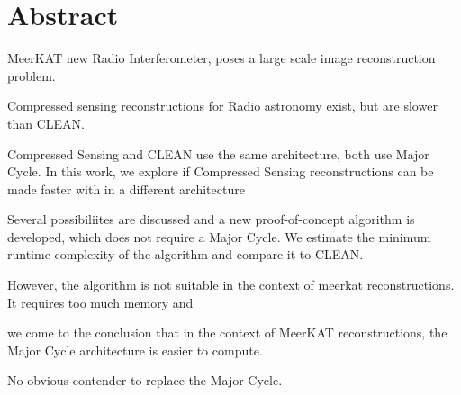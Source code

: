 \section*{Abstract}
MeerKAT new Radio Interferometer, poses a large scale image reconstruction problem.

Compressed sensing reconstructions for Radio astronomy exist, but are slower than CLEAN. 

Compressed Sensing and CLEAN use the same architecture, both use Major Cycle. In this work, we explore if Compressed Sensing reconstructions can be made faster with in a different architecture

Several possibiliites are discussed and a new proof-of-concept algorithm is developed, which does not require a Major Cycle. We estimate the minimum runtime complexity of the algorithm and compare it to CLEAN. 

However, the algorithm is not suitable in the context of meerkat reconstructions. It requires too much memory and 

we come to the conclusion that in the context of MeerKAT reconstructions, the Major Cycle architecture is easier to compute.

No obvious contender to replace the Major Cycle.